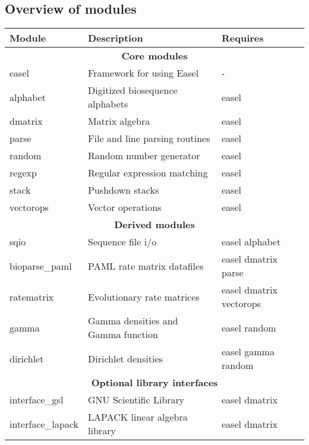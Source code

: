 \subsection{Overview of modules}
\begin{tabular}{lll}\hline
\textbf{Module}            & \textbf{Description}                       & \textbf{Requires}\\\hline
  \multicolumn{3}{c}{\textbf{Core modules}}\\
easel                      & Framework for using Easel                  &  - \\
alphabet                   & Digitized biosequence alphabets            & easel \\
dmatrix                    & Matrix algebra                             & easel\\ 
parse                      & File and line parsing routines             & easel\\
random                     & Random number generator                    & easel\\
regexp                     & Regular expression matching                & easel\\
stack                      & Pushdown stacks                            & easel\\
vectorops                  & Vector operations                          & easel\\\hline
  \multicolumn{3}{c}{\textbf{Derived modules}}\\
sqio                       & Sequence file i/o                          & easel alphabet\\
bioparse\_paml             & PAML rate matrix datafiles                 & easel dmatrix parse \\
ratematrix                 & Evolutionary rate matrices                 & easel dmatrix vectorops\\
gamma                      & Gamma densities and Gamma function         & easel random\\
dirichlet                  & Dirichlet densities                        & easel gamma random\\ \hline     
  \multicolumn{3}{c}{\textbf{Optional library interfaces}}\\
interface\_gsl             & GNU Scientific Library                     & easel dmatrix\\
interface\_lapack          & LAPACK linear algebra library              & easel dmatrix \\\hline
\end{tabular}



